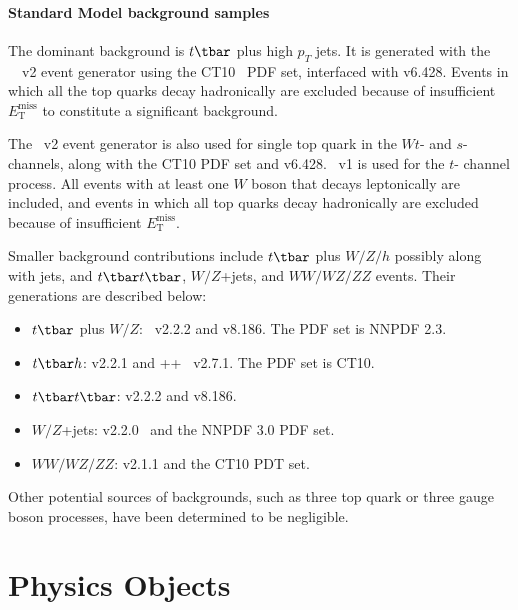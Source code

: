 \paragraph{Standard Model background samples} The dominant background is
$t\tbar$ plus high $p_T$ jets. It is generated with the
\POWHEGBOX~\cite{Alioli:2010xd}~v2 event generator using the
CT10~\cite{Lai:2010vv} PDF set, interfaced with \PYTHIA v6.428. Events in which
all the top quarks decay hadronically are excluded because of insufficient
$E_{\text{T}}^{\text{miss}}$ to constitute a significant background.

The \POWHEGBOX~v2 event generator is also used for single top quark in the
$Wt$- and $s$- channels, along with the CT10 PDF set and \PYTHIA v6.428.
\POWHEGBOX~v1 is used for the $t$- channel process. All events with at least
one $W$ boson that decays leptonically are included, and events in which all
top quarks decay hadronically are excluded because of insufficient
$E_{\text{T}}^{\text{miss}}$.

Smaller background contributions include $t\tbar$ plus $W/Z/h$ possibly along
with jets, and $t\tbar t\tbar$, $W/Z$+jets, and $WW/WZ/ZZ$ events. Their
generations are described below: 

\begin{itemize}

	\item $t\tbar$ plus $W/Z$: \MGMCatNLO~v2.2.2 and \PYTHIA v8.186. The PDF set is
	      NNPDF 2.3.

	\item $t\tbar h$: \MGMCatNLO v2.2.1 and \MYHERWIG++~\cite{Bahr:2008pv} v2.7.1.
	      The PDF set is CT10.

	\item $t\tbar t\tbar$: \MGMCatNLO v2.2.2 and \PYTHIA v8.186.

	\item $W/Z$+jets: \SHERPA v2.2.0~\cite{Gleisberg:2008ta} and the NNPDF 3.0 PDF
	      set.

	\item $WW/WZ/ZZ$: \SHERPA v2.1.1 and the CT10 PDT set.
\end{itemize}

Other potential sources of backgrounds, such as three top quark or three gauge
boson processes, have been determined to be negligible.

\section{Physics Objects}\label{mbobjs}

